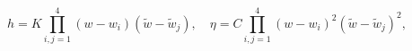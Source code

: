 \begin{equation}
h = K \prod_{i,j=1}^{4} (w - w_{i}) (\tilde{w} - \tilde{w}_{j}), \quad 
\eta = C \prod_{i,j=1}^{4} (w - w_{i})^{2} (\tilde{w} -
      \tilde{w}_{j})^{2},
\end{equation}

